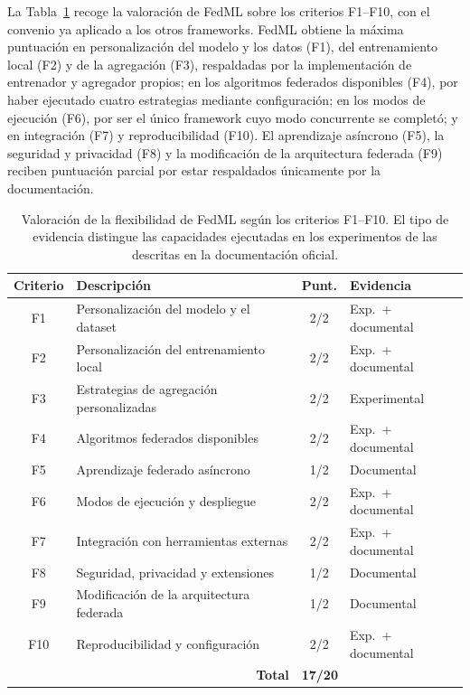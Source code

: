 La Tabla~\ref{tab:flex-fedml-score} recoge la valoración de FedML sobre los criterios
F1--F10, con el convenio ya aplicado a los otros frameworks. FedML obtiene la máxima
puntuación en personalización del modelo y los datos (F1), del entrenamiento local
(F2) y de la agregación (F3), respaldadas por la implementación de entrenador y
agregador propios; en los algoritmos federados disponibles (F4), por haber ejecutado
cuatro estrategias mediante configuración; en los modos de ejecución (F6), por ser el
único framework cuyo modo concurrente se completó; y en integración (F7) y
reproducibilidad (F10). El aprendizaje asíncrono (F5), la seguridad y privacidad (F8)
y la modificación de la arquitectura federada (F9) reciben puntuación parcial por
estar respaldados únicamente por la documentación.

\begin{table}[htbp]
  \centering
  \caption{Valoración de la flexibilidad de FedML según los criterios F1--F10. El
  tipo de evidencia distingue las capacidades ejecutadas en los experimentos de las
  descritas en la documentación oficial.}
  \label{tab:flex-fedml-score}
  \begin{tabular}{clcl}
    \toprule
    \textbf{Criterio} & \textbf{Descripción} & \textbf{Punt.} & \textbf{Evidencia} \\
    \midrule
    F1  & Personalización del modelo y el dataset      & 2/2 & Exp.\ + documental \\
    F2  & Personalización del entrenamiento local      & 2/2 & Exp.\ + documental \\
    F3  & Estrategias de agregación personalizadas     & 2/2 & Experimental \\
    F4  & Algoritmos federados disponibles             & 2/2 & Exp.\ + documental \\
    F5  & Aprendizaje federado asíncrono               & 1/2 & Documental \\
    F6  & Modos de ejecución y despliegue              & 2/2 & Exp.\ + documental \\
    F7  & Integración con herramientas externas        & 2/2 & Exp.\ + documental \\
    F8  & Seguridad, privacidad y extensiones          & 1/2 & Documental \\
    F9  & Modificación de la arquitectura federada     & 1/2 & Documental \\
    F10 & Reproducibilidad y configuración             & 2/2 & Exp.\ + documental \\
    \midrule
    \multicolumn{2}{r}{\textbf{Total}} & \multicolumn{2}{l}{\textbf{17/20}} \\
    \bottomrule
  \end{tabular}
\end{table}

